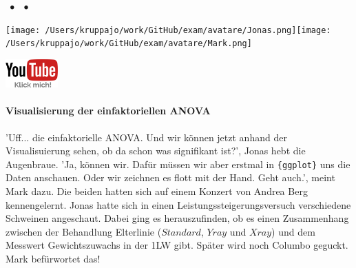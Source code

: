 \documentclass[a4paper, 9pt]{scrartcl}\usepackage[]{graphicx}\usepackage[]{xcolor}
\begin{document}
 
\ifcollection
\begin{flushright}
\tiny\vspace{-3Ex}
\textbf{\examinhaltstart}
\exammodulemathstat $\;\bullet$
\exammodulestat $\;\bullet$
\exammodulestatbbv 
\vspace{-4Ex}
\end{flushright}
\begin{minipage}[t]{0.5\textwidth}
\texttt{[image: /Users/kruppajo/work/GitHub/exam/avatare/Jonas.png]}\hspace{-4mm}\texttt{[image: /Users/kruppajo/work/GitHub/exam/avatare/Mark.png]}
\end{minipage}
\begin{minipage}[t]{0.5\textwidth}
\hfill
\href{https://youtu.be/wEePzcwwti8}{\includegraphics[width = 2cm]{img/youtube}}
\end{minipage}
\fi



\ifcollection
\paragraph{Visualisierung der einfaktoriellen ANOVA}
\fi

'Uff... die einfaktorielle ANOVA. Und wir können jetzt anhand der Visualisuierung sehen, ob da schon was signifikant ist?', Jonas hebt die Augenbraue. 'Ja, können wir. Dafür müssen wir aber erstmal in \texttt{\{ggplot\}} uns die Daten anschauen. Oder wir zeichnen es flott mit der Hand. Geht auch.', meint Mark dazu. Die beiden hatten sich auf einem Konzert von Andrea Berg kennengelernt. Jonas hatte sich in einen Leistungssteigerungsversuch verschiedene Schweinen angeschaut. Dabei ging es herauszufinden, ob es einen Zusammenhang zwischen der Behandlung Elterlinie ($Standard$, $Yray$ und $Xray$) und dem Messwert Gewichtszuwachs in der 1LW gibt. Später wird noch Columbo geguckt. Mark befürwortet das!
\end{document}
